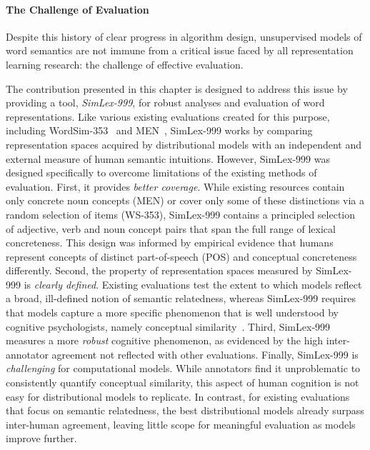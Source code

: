 \paragraph{The Challenge of Evaluation} Despite this history of clear progress in algorithm design, unsupervised models of word semantics are not immune from a critical issue faced by all representation learning research: the challenge of effective evaluation. 

The contribution presented in this chapter is designed to address this issue by providing a tool, \emph{SimLex-999}, for robust analyses and evaluation of word representations. Like various existing evaluations created for this purpose, including WordSim-353~\citep{finkelstein2001placing} and MEN~\citep{bruni2014multimodal}, SimLex-999 works by comparing representation spaces acquired by distributional models with an independent and external measure of human semantic intuitions. However, SimLex-999 was designed specifically to overcome limitations of the existing methods of evaluation. First, it provides \emph{better coverage}. While existing resources contain only concrete noun concepts (MEN) or cover only some of these distinctions via a random selection of items (WS-353), SimLex-999 contains a principled selection of adjective, verb and noun concept pairs that span the full range of lexical concreteness. This design was informed by empirical evidence that humans represent concepts of distinct part-of-speech (POS) \citep{gentner1978relational} and conceptual concreteness \citep{hill2013quantitative} differently. Second, the property of representation spaces measured by SimLex-999 is \emph{clearly defined}. Existing evaluations test the extent to which models reflect a broad, ill-defined notion of semantic relatedness, whereas SimLex-999 requires that models capture a more specific phenomenon that is well understood by cognitive psychologists, namely conceptual similarity~\citep{tversky1977features}. Third, SimLex-999 measures a more \emph{robust} cognitive phenomenon, as evidenced by the high inter-annotator agreement not reflected with other evaluations. Finally,  SimLex-999 is \emph{challenging} for computational models. While annotators find it unproblematic to consistently quantify conceptual similarity, this aspect of human cognition is not easy for distributional models to replicate. In contrast, for existing evaluations that focus on semantic relatedness, the best distributional models already surpass inter-human agreement, leaving little scope for meaningful evaluation as models improve further. 

